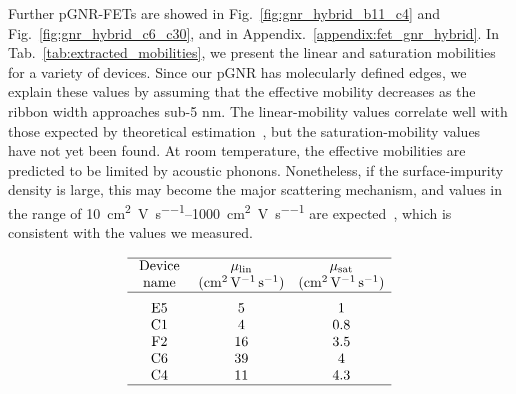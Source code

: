 Further \gls{pGNR}-\glspl{FET} are showed in Fig.~\ref{fig:gnr_hybrid_b11_c4} and Fig.~\ref{fig:gnr_hybrid_c6_c30}, and in Appendix.~\ref{appendix:fet_gnr_hybrid}. In Tab.~\ref{tab:extracted_mobilities}, we present the linear and saturation mobilities for a variety of devices. Since our pGNR has molecularly defined edges, we explain these values by assuming that the effective mobility decreases as the ribbon width approaches sub-5 nm. The linear-mobility values correlate well with those expected by theoretical estimation~\cite{geng2017graphene}, but the saturation-mobility values have not yet been found. At room temperature, the effective mobilities are predicted to be limited by acoustic phonons. Nonetheless, if the surface-impurity density is large, this may become the major scattering mechanism, and values in the range of \SIrange{10}{1000}{\centi\metre\squared\per\volt\per\second} are expected~\cite{fang2008mobility}, which is consistent with the values we measured.
%
\begin{table}
    \caption{\label{tab:extracted_mobilities}
        Linear and saturation mobilities extracted from the transfer characteristics of several devices.}
    \[
        \begin{array}{ccc}
            \hline \text { Device } & \mu_{\operatorname{lin}}                        & \mu_{\text{sat}}                                      \\
            \textrm{name}           & (\si{\centi\metre\squared\per\volt\per\second}) & (\si{\centi\metre\squared\per\volt\per\second})       \\
            \hline \text { E5 }     & 5                                               & 1                                             \Tsmall \\
            \text { C1 }            & 4                                               & 0.8                                                   \\
            \text { F2 }            & 16                                              & 3.5                                                   \\
            \text { C6 }            & 39                                              & 4                                                     \\
            \text { C4 }            & 11                                              & 4.3                                                   \\
            \hline
        \end{array}
    \]
\end{table}




